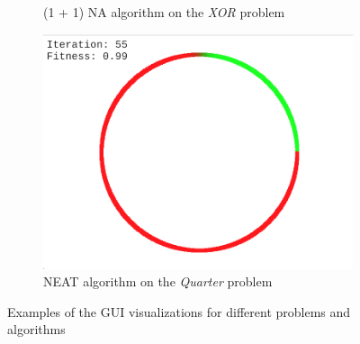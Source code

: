 \begin{figure}
\begin{subfigure}{0.5\textwidth}
        \caption{(1 + 1) NA algorithm on the \textit{XOR} problem}
    \end{subfigure}%
    \hfill
    \begin{subfigure}{0.5\textwidth}
        \centering
        \includegraphics[width=0.8\linewidth]{Pictures/neat_sphere_gui}
        \caption{NEAT algorithm on the \textit{Quarter} problem}
    \end{subfigure}%
    \caption{Examples of the GUI visualizations for different problems and algorithms}
    \label{fig:gui_screenshots}
\end{figure}
